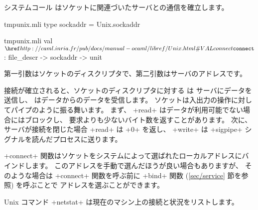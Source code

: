 システムコール  はソケットに関連づいたサーバとの通信を確立します。
%
\begin{codefile}{tmpunix.mli}
type sockaddr = Unix.sockaddr
\end{codefile}
%
\begin{listingcodefile}{tmpunix.mli}
val $\libvalue{Unix}{connect}$ : file_descr -> sockaddr -> unit
\end{listingcodefile}
%
第一引数はソケットのディスクリプタで、第二引数はサーバのアドレスです。

接続が確立されると、ソケットのディスクリプタに対する  は
サーバにデータを送信し、 はデータからのデータを受信します。
ソケットは入出力の操作に対してパイプのように振る舞います。
まず、 \ml+read+ はデータが利用可能でない場合にはブロックし、
要求よりも少ないバイト数を返すことがあります。
次に、サーバが接続を閉じた場合 \ml+read+ は \ml+0+ を返し、 \ml+write+ は
\ml+sigpipe+ シグナルを読んだプロセスに送ります。

\ml+connect+ 関数はソケットをシステムによって選ばれたローカルアドレスにバインドします。
このアドレスを手動で選んだほうが良い場合もありますが、
そのような場合は \ml+connect+ 関数を呼ぶ前に \ml+bind+ 関数 (\ref{sec/service} 節を参照) を呼ぶことで
アドレスを選ぶことができます。

Unix コマンド \ml+netstat+ は現在のマシン上の接続と状況をリストします。

